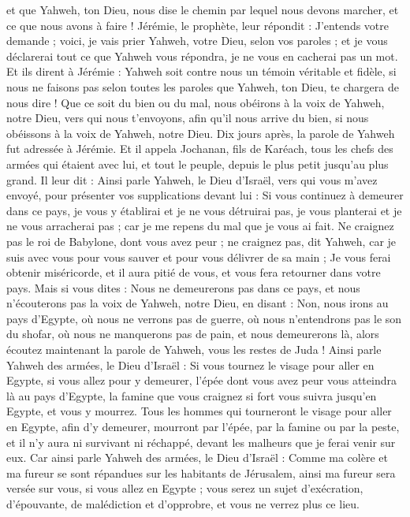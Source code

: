 \begin{multicols}{2}
et que Yahweh, ton Dieu, nous dise le chemin par lequel nous devons marcher, et ce que nous avons à faire !
Jérémie, le prophète, leur répondit : J'entends votre demande ; voici, je vais prier Yahweh, votre Dieu, selon vos paroles ; et je vous déclarerai tout ce que Yahweh vous répondra, je ne vous en cacherai pas un mot.
Et ils dirent à Jérémie : Yahweh soit contre nous un témoin véritable et fidèle, si nous ne faisons pas selon toutes les paroles que Yahweh, ton Dieu, te chargera de nous dire !
Que ce soit du bien ou du mal, nous obéirons à la voix de Yahweh, notre Dieu, vers qui nous t'envoyons, afin qu'il nous arrive du bien, si nous obéissons à la voix de Yahweh, notre Dieu.
Dix jours après, la parole de Yahweh fut adressée à Jérémie.
Et il appela Jochanan, fils de Karéach, tous les chefs des armées qui étaient avec lui, et tout le peuple, depuis le plus petit jusqu'au plus grand.
Il leur dit : Ainsi parle Yahweh, le Dieu d'Israël, vers qui vous m'avez envoyé, pour présenter vos supplications devant lui :
Si vous continuez à demeurer dans ce pays, je vous y établirai et je ne vous détruirai pas, je vous planterai et je ne vous arracherai pas ; car je me repens du mal que je vous ai fait.
Ne craignez pas le roi de Babylone, dont vous avez peur ; ne craignez pas, dit Yahweh, car je suis avec vous pour vous sauver et pour vous délivrer de sa main ;
Je vous ferai obtenir miséricorde, et il aura pitié de vous, et vous fera retourner dans votre pays.
Mais si vous dites : Nous ne demeurerons pas dans ce pays, et nous n'écouterons pas la voix de Yahweh, notre Dieu,
en disant : Non, nous irons au pays d'Egypte, où nous ne verrons pas de guerre, où nous n'entendrons pas le son du shofar, où nous ne manquerons pas de pain, et nous demeurerons là,
alors écoutez maintenant la parole de Yahweh, vous les restes de Juda ! Ainsi parle Yahweh des armées, le Dieu d'Israël : Si vous tournez le visage pour aller en Egypte, si vous allez pour y demeurer,
l'épée dont vous avez peur vous atteindra là au pays d'Egypte, la famine que vous craignez si fort vous suivra jusqu’en Egypte, et vous y mourrez.
Tous les hommes qui tourneront le visage pour aller en Egypte, afin d'y demeurer, mourront par l'épée, par la famine ou par la peste, et il n’y aura ni survivant ni réchappé, devant les malheurs que je ferai venir sur eux.
Car ainsi parle Yahweh des armées, le Dieu d'Israël : Comme ma colère et ma fureur se sont répandues sur les habitants de Jérusalem, ainsi ma fureur sera versée sur vous, si vous allez en Egypte ; vous serez un sujet d’exécration, d’épouvante, de malédiction et d’opprobre, et vous ne verrez plus ce lieu.

\end{multicols}
